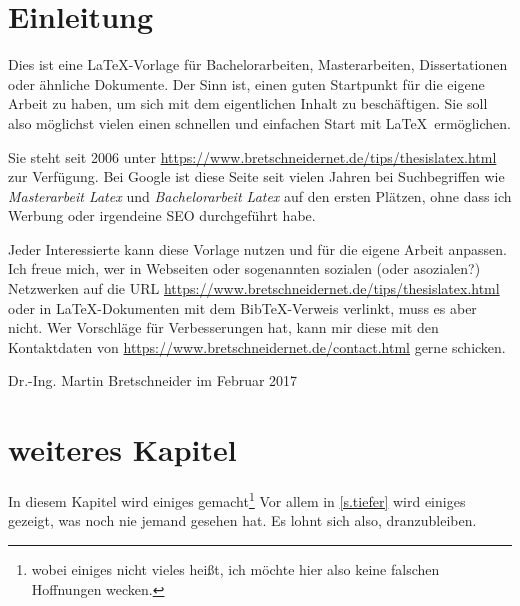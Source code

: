 \chapter{Einleitung}

Dies ist eine \LaTeX-Vorlage für Bachelorarbeiten, Masterarbeiten, Dissertationen oder ähnliche Dokumente. Der Sinn ist, einen guten Startpunkt für die eigene Arbeit zu haben, um sich mit dem eigentlichen Inhalt zu beschäftigen. Sie soll also möglichst vielen einen schnellen und einfachen Start mit \LaTeX\ ermöglichen.

Sie steht seit 2006 unter \url{https://www.bretschneidernet.de/tips/thesislatex.html} zur Verfügung.  Bei Google ist diese Seite seit vielen Jahren bei Suchbegriffen wie \textit{Masterarbeit Latex} und \textit{Bachelorarbeit Latex} auf den ersten Plätzen, ohne dass ich Werbung oder irgendeine SEO durchgeführt habe.

Jeder Interessierte kann diese Vorlage nutzen und für die eigene Arbeit anpassen. Ich freue mich, wer in Webseiten oder sogenannten sozialen (oder asozialen?) Netzwerken auf die URL \url{https://www.bretschneidernet.de/tips/thesislatex.html} oder in \LaTeX-Dokumenten mit dem BibTeX-Verweis\cite{thesislatex} verlinkt, muss es aber nicht. Wer Vorschläge für Verbesserungen hat, kann mir diese mit den Kontaktdaten von \url{https://www.bretschneidernet.de/contact.html} gerne schicken.

Dr.-Ing. Martin Bretschneider im Februar 2017





\chapter{weiteres Kapitel}\label{c.weitereskapitel}
In diesem Kapitel wird einiges gemacht\footnote{wobei einiges nicht vieles heißt, ich möchte hier also keine falschen Hoffnungen wecken.} Vor allem in \autoref{s.tiefer} wird einiges gezeigt, was noch nie jemand gesehen hat. Es lohnt sich also, dranzubleiben.

